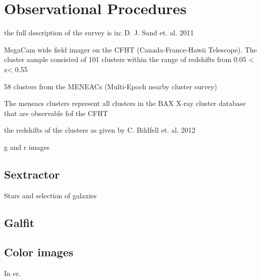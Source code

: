 
\chapter{Observational Procedures}

the full description of the survey is in: D. J. Sand et. al. 2011

MegaCam wide field imager on the CFHT (Canada-France-Hawii Telescope). The cluster sample consisted of 101 clusters within the range of redshifts from 0.05 < z< 0.55

58 clusters from the MENEACs (Multi-Epoch nearby cluster survey)

The meneacs clusters represent all clusters in the BAX X-ray cluster database that are observable fof the CFHT

the redshifts of the clusters as given by C. Bildfell et. al. 2012 

g and r images

\section{Sextractor}

Stars and selection of galaxies

\section{Galfit}

\section{Color images}


In er.  